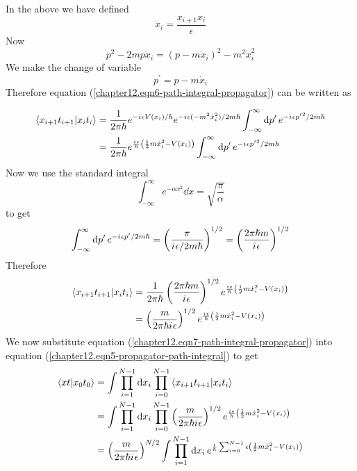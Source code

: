	In the above we have defined
	\begin{equation}
		\dot{x}_i = \frac{x_{i+1} x_i}{\epsilon}
	\end{equation}
	Now
	\begin{equation}
		p^2 - 2m p \dot{x}_i = (p- m \dot{x}_i)^2 - m^2 \dot{x}_i^2
	\end{equation}
	We make the change of variable
	\begin{equation}
		p^\prime = p -m \dot{x}_i
	\end{equation}
	Therefore equation (\ref{chapter12.eqn6-path-integral-propagator}) can be written as
	
	\begin{align}
		\braket{x_{i+1} t_{i+1}}{x_i t_i} 
		&= \frac{1}{2 \pi \hbar} e^{-{i\mkern1mu} \epsilon V(x_i)/\hbar} e^{-{i\mkern1mu} \epsilon (-m^2 \dot{x}_i^2) / 2 m \hbar}  \int_{-\infty}^{\infty} \dd{p^\prime} e^{-{i\mkern1mu} \epsilon {p^\prime}^2 / 2 m \hbar} \\
		&= \frac{1}{2 \pi \hbar} e^{\frac{{i\mkern1mu} \epsilon}{\hbar} \left(\frac{1}{2} m \dot{x}_i^2 - V(x_i)\right)} \int_{-\infty}^{\infty} \dd{p^\prime} e^{-{i\mkern1mu} \epsilon {p^\prime}^2 / 2 m \hbar}
	\end{align}
	Now we use the standard integral
	\begin{equation}
		\int_{-\infty}^{\infty} e^{-\alpha x^2} \dd{x} = \sqrt{\frac{\pi}{\alpha}}
	\end{equation}
	to get
	\begin{equation}
		\int_{-\infty}^{\infty} \dd{p^\prime} e^{-{i\mkern1mu} \epsilon p^\prime / 2 m \hbar} = \left(\frac{\pi}{{i\mkern1mu} \epsilon/2 m \hbar}\right)^{1/2} = \left(\frac{2 \pi \hbar m}{{i\mkern1mu} \epsilon}\right)^{1/2}
	\end{equation}
	Therefore
	\begin{align}
		\braket{x_{i+1} t_{i+1}}{x_i t_i} 
		&= \frac{1}{2 \pi \hbar} \left(\frac{2 \pi \hbar m}{{i\mkern1mu} \epsilon}\right)^{1/2} e^{\frac{{i\mkern1mu} \epsilon}{\hbar} \left(\frac{1}{2} m \dot{x}_i^2 - V(x_i)\right)} \\
		&= \left(\frac{m}{2\pi\hbar{i\mkern1mu} \epsilon}\right)^{1/2} e^{\frac{{i\mkern1mu} \epsilon}{\hbar} \left(\frac{1}{2} m \dot{x}_i^2 - V(x_i)\right)}
		\label{chapter12.eqn7-path-integral-propagator}
	\end{align}
	We now substitute equation (\ref{chapter12.eqn7-path-integral-propagator}) into equation (\ref{chapter12.eqn5-propagator-path-integral}) to get
	\begin{align}
		\braket{x t}{x_0 t_0} 
		&= \int \prod_{i=1}^{N-1} \dd{x_i} \prod_{i=0}^{N-1} \braket{x_{i+1} t_{i+1}}{x_i t_i}\\
		&= \int \prod_{i=1}^{N-1} \dd{x_i} \prod_{i=0}^{N-1} \left(\frac{m}{2 \pi \hbar {i\mkern1mu} \epsilon}\right)^{1/2} e^{\frac{{i\mkern1mu} \epsilon}{\hbar} \left(\frac{1}{2} m \dot{x}_i^2 - V(x_i)\right)} \\
		&= \left(\frac{m}{2 \pi \hbar {i\mkern1mu} \epsilon}\right)^{N/2} \int \prod_{i=1}^{N-1} \dd{x_i}e^{\frac{{i\mkern1mu}}{\hbar} \sum_{i=0}^{N-1} \epsilon \left(\frac{1}{2} m \dot{x}_i^2 - V(x_i)\right)}
		\label{chapter12.eqn8-path-integral-propagator}
	\end{align}
